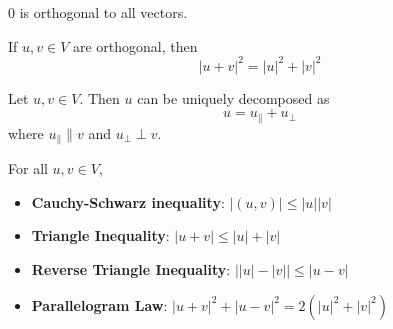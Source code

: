 \begin{lemma}
  0 is orthogonal to all vectors.
\end{lemma}

\begin{namedtheorem}
  If $u, v \in V$ are orthogonal, then
  \[
    |u + v|^2 = |u|^2 + |v|^2
  \]
\end{namedtheorem}

\begin{theorem}
  Let $u, v \in V$. Then $u$ can be uniquely decomposed as
  \[
    u = u_{\parallel} + u_{\perp}
  \]
  where $u_{\parallel} \parallel v$ and $u_{\perp} \perp v$.
\end{theorem}

\begin{theorem}
  For all $u, v \in V$,
  \begin{itemize}
    \item \textbf{Cauchy-Schwarz inequality}: $|(u, v)| \leq |u| |v|$
    \item \textbf{Triangle Inequality}: $|u + v| \leq |u| + |v|$
    \item \textbf{Reverse Triangle Inequality}: $\left| |u| - |v| \right| \leq |u - v|$
    \item \textbf{Parallelogram Law}: $|u + v|^2 + |u - v|^2 = 2 ( |u|^2 + |v|^2 )$
  \end{itemize}
\end{theorem}




